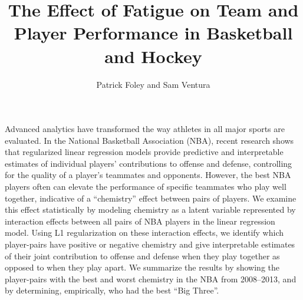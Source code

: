 \documentclass{article}
\author{Patrick Foley and Sam Ventura}
\title{The Effect of Fatigue on Team and Player Performance in Basketball and Hockey}
\begin{document}
\maketitle{}

Advanced analytics have transformed the way athletes in all major sports are evaluated.  In the National Basketball Association (NBA), recent research shows that regularized linear regression models provide predictive and interpretable estimates of individual players’ contributions to offense and defense, controlling for the quality of a player’s teammates and opponents.  However, the best NBA players often can elevate the performance of specific teammates who play well together, indicative of a “chemistry” effect between pairs of players.  We examine this effect statistically by modeling chemistry as a latent variable represented by interaction effects between all pairs of NBA players in the linear regression model.  Using L1 regularization on these interaction effects, we identify which player-pairs have positive or negative chemistry and give interpretable estimates of their joint contribution to offense and defense when they play together as opposed to when they play apart.  We summarize the results by showing the player-pairs with the best and worst chemistry in the NBA from 2008--2013, and by determining, empirically, who had the best “Big Three”.  
\end{document}
